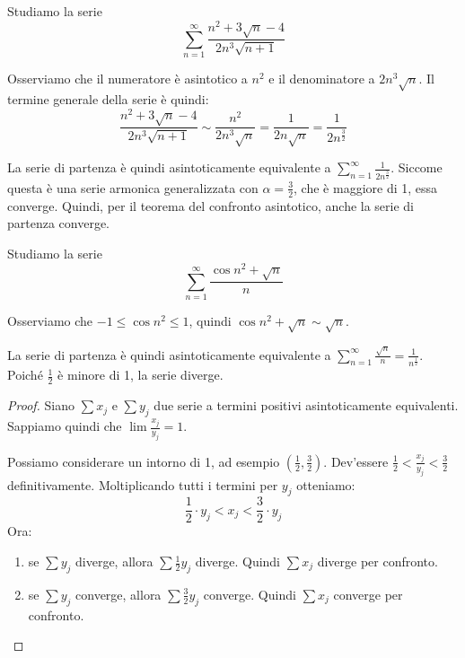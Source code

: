\begin{example}
Studiamo la serie 
\begin{equation*}
\sum_{n=1}^\infty \frac{n^2 + 3\sqrt{n}-4}{2n^3\sqrt{n+1}}
\end{equation*}

Osserviamo che il numeratore è asintotico a $n^2$ e il denominatore a $2n^3\sqrt{n}$. Il termine generale della serie è quindi:
\begin{equation*}
\frac{n^2 + 3\sqrt{n}-4}{2n^3\sqrt{n+1}} \sim \frac{n^2}{2n^3\sqrt{n}} = \frac{1}{2n\sqrt{n}} = \frac{1}{2n^{\frac{3}{2}}}
\end{equation*}

La serie di partenza è quindi asintoticamente equivalente a $\sum_{n=1}^\infty \frac{1}{2n^{\frac{3}{2}}}$. Siccome questa è una serie armonica generalizzata con $\alpha = \frac{3}{2}$, che è maggiore di 1, essa converge. Quindi, per il teorema del confronto asintotico, anche la serie di partenza converge.
\end{example}

\begin{example}
Studiamo la serie 
\begin{equation*}
\sum_{n=1}^\infty \frac{\cos n^2 + \sqrt{n}}{n}
\end{equation*}

Osserviamo che $-1 \le \cos n^2 \le 1$, quindi $\cos n^2 + \sqrt{n} \sim \sqrt{n}$.

La serie di partenza è quindi asintoticamente equivalente a $\sum_{n=1}^\infty \frac{\sqrt{n}}{n} = \frac{1}{n^\frac{1}{2}}$. Poiché $\frac{1}{2}$ è minore di 1, la serie diverge.
\end{example}

\begin{proof}
Siano $\sum x_j$ e $\sum y_j$ due serie a termini positivi asintoticamente equivalenti. Sappiamo quindi che $\lim \frac{x_j}{y_j} = 1$.

Possiamo considerare un intorno di 1, ad esempio $(\frac{1}{2}, \frac{3}{2})$. Dev'essere $\frac{1}{2} < \frac{x_j}{y_j} < \frac{3}{2}$ definitivamente. Moltiplicando tutti i termini per $y_j$ otteniamo:
\begin{equation*}
\frac{1}{2} \cdot y_j < x_j < \frac{3}{2} \cdot y_j
\end{equation*}
Ora:
\begin{enumerate}
\item se $\sum y_j$ diverge, allora $\sum \frac{1}{2} y_j$ diverge. Quindi $\sum x_j$ diverge per confronto.
\item se $\sum y_j$ converge, allora $\sum \frac{3}{2} y_j$ converge. Quindi $\sum x_j$ converge per confronto.
\end{enumerate}
\end{proof}

